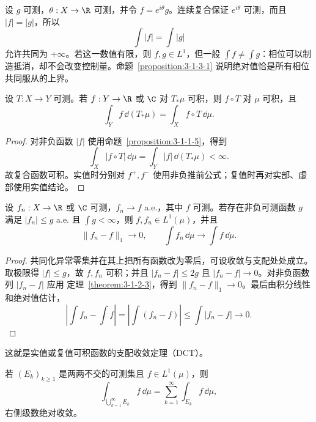 \begin{example}[复相位只改变抵消]\label{ex:3-1-3-3}
设 $g$ 可测，$\theta:X\to\R$ 可测，并令 $f=e^{i\theta}g$。连续复合保证
$e^{i\theta}$ 可测，而且 $|f|=|g|$，所以
\[
 \int|f|=\int|g|
\]
允许共同为 $+\infty$。若这一数值有限，则 $f,g\in L^1$，但一般
$\int f\ne\int g$：相位可以制造抵消，却不会改变控制量。命题~\ref{proposition:3-1-3-1}
说明绝对值恰是所有相位共同服从的上界。
\end{example}

\begin{corollary}[实值与复值推前积分公式]\label{corollary:3-1-3-pushforward}
设 $T:X\to Y$ 可测。若 $f:Y\to\R$ 或 $\C$ 对 $T_*\mu$ 可积，则
$f\circ T$ 对 $\mu$ 可积，且
\[
 \int_Yf\,\dd(T_*\mu)=\int_Xf\circ T\,\dd\mu.
 \tag{3.1.21}\label{eq:3-1-pushforward-signed}
\]
\end{corollary}

\begin{proof}
对非负函数 $|f|$ 使用命题~\ref{proposition:3-1-1-5}，得到
\[
 \int_X|f\circ T|\,\dd\mu
 =\int_Y|f|\,\dd(T_*\mu)<\infty.
\]
故复合函数可积。实值时分别对 $f^+,f^-$ 使用非负推前公式；复值时再对实部、虚部使用实值结论。
\end{proof}

\begin{theorem}[实值与复值支配收敛]\label{theorem:3-1-3-5}
设 $f_n:X\to\R$ 或 $\C$ 可测，$f_n\to f$ a.e.，其中 $f$ 可测。若存在非负可测函数
$g$ 满足 $|f_n|\leq g$ a.e. 且 $\int g<\infty$，则 $f,f_n\in L^1(\mu)$，并且
\[
 \|f_n-f\|_1\longrightarrow0,
 \qquad
 \int f_n\,\dd\mu\longrightarrow\int f\,\dd\mu.
 \tag{3.1.22}\label{eq:3-1-full-dct}
\]
\end{theorem}

\begin{proof}
共同化异常零集并在其上把所有函数改为零后，可设收敛与支配处处成立。
取极限得 $|f|\leq g$，故 $f,f_n$ 可积；并且
$|f_n-f|\leq2g$ 且 $|f_n-f|\to0$。对非负函数列 $|f_n-f|$ 应用
定理~\ref{theorem:3-1-2-3}，得到 $\|f_n-f\|_1\to0$。最后由积分线性和绝对值估计，
\[
 \left|\int f_n-\int f\right|
 =\left|\int(f_n-f)\right|
 \leq\int|f_n-f|\longrightarrow0.
\]
\end{proof}

这就是实值或复值可积函数的支配收敛定理（DCT）。

\begin{proposition}[限制与拼接]\label{proposition:3-1-3-3}
若 $(E_k)_{k\geq1}$ 是两两不交的可测集且 $f\in L^1(\mu)$，则
\[
 \int_{\bigcup_{k=1}^\infty E_k}f\,\dd\mu
 =\sum_{k=1}^\infty\int_{E_k}f\,\dd\mu,
 \tag{3.1.23}\label{eq:3-1-patching}
\]
右侧级数绝对收敛。
\end{proposition}

